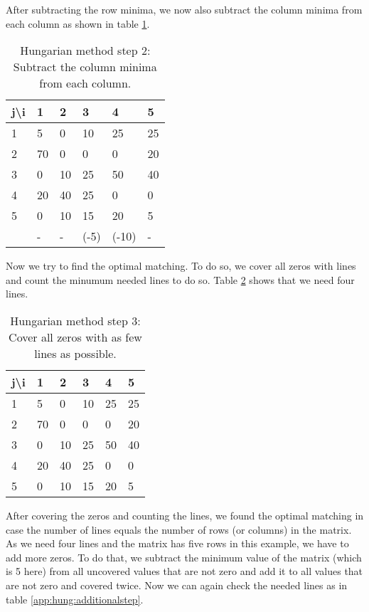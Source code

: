 After subtracting the row minima, we now also subtract the column minima from each column as shown in table \ref{app:hung:step2}.

\begin{table}[h]
    \centering
    \begin{tabular}{|l | l l l l l |}
    \hline
    j\textbackslash i & 1 & 2 & 3 & 4 & 5\\ \hline
    1 & 5 & 0 & 10 & 25 & 25\\
    2 & 70 & 0 & 0 & 0 & 20\\
    3 & 0 & 10 & 25 & 50 & 40\\
    4 & 20 & 40 & 25 & 0 & 0\\
    5 & 0 & 10 & 15 & 20 & 5\\ \hline
    & - & - & (-5) & (-10) & -\\ \hline
    \end{tabular}
    \caption{Hungarian method step 2: Subtract the column minima from each column.}
    \label{app:hung:step2}
\end{table}

Now we try to find the optimal matching. To do so, we cover all zeros with lines and count the minumum needed lines to do so. Table \ref{app:hung:step3} shows that we need four lines.

\begin{table}[h]
    \centering
    \begin{tabular}{|l | l l l l l |}
    \hline
    j\textbackslash i & 1 & 2 & 3 & 4 & 5\\ \hline
    1 & \cellcolor{orange!25}5 & \cellcolor{orange!50}0 & 10 & 25 & 25\\
    2 & \cellcolor{orange!75}70 & \cellcolor{orange!75}0 & \cellcolor{orange!75}0 & \cellcolor{orange!75}0 & \cellcolor{orange!75}20\\
    3 & \cellcolor{orange!25}0 & \cellcolor{orange!50}10 & 25 & 50 & 40\\
    4 & \cellcolor{orange!75}20 & \cellcolor{orange!75}40 & \cellcolor{orange!75}25 & \cellcolor{orange!75}0 & \cellcolor{orange!75}0\\
    5 & \cellcolor{orange!25}0 & \cellcolor{orange!50}10 & 15 & 20 & 5\\ \hline
    \end{tabular}
    \caption{Hungarian method step 3: Cover all zeros with as few lines as possible.}
    \label{app:hung:step3}
\end{table}

After covering the zeros and counting the lines, we found the optimal matching in case the number of lines equals the number of rows (or columns) in the matrix. As we need four lines and the matrix has five rows in this example, we have to add more zeros. To do that, we subtract the minimum value of the matrix (which is 5 here) from all uncovered values that are not zero and add it to all values that are not zero and covered twice. Now we can again check the needed lines as in table \ref{app:hung:additionalstep}.

